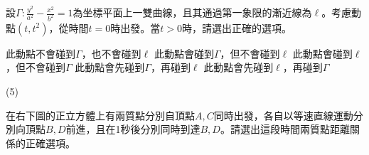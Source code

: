 \begin{QUESTIONS}
\begin{QUESTION}
\end{QUESTION}
\begin{QUESTION}
    \begin{QBODY}
        設$\Gamma :\frac{{{y}^{2}}}{{{a}^{2}}}-\frac{{{x}^{2}}}{{{b}^{2}}}=1$為坐標平面上一雙曲線，且其通過第一象限的漸近線為$\ell $。考慮動點$(t,{{t}^{2}})$，從時間$t=0$時出發。當$t>0$時，請選出正確的選項。
        \begin{QOPS}
        \QOP 此動點不會碰到$\Gamma $，也不會碰到$\ell $
        \QOP 此動點會碰到$\Gamma $，但不會碰到$\ell $
        \QOP 此動點會碰到$\ell $，但不會碰到$\Gamma $
        \QOP 此動點會先碰到$\Gamma $，再碰到$\ell $
        \QOP 此動點會先碰到$\ell $，再碰到$\Gamma $
        \end{QOPS}
    \end{QBODY}
    \begin{QFROMS}
    \end{QFROMS}
    \begin{QTAGS}
    \end{QTAGS}
    \begin{QANS}
        (5)
    \end{QANS}
    \begin{QSOL}
    \end{QSOL}
    \begin{QEMPTYSPACE}
    \end{QEMPTYSPACE}
\end{QUESTION}
\begin{QUESTION}
    \begin{QBODY}
        在右下圖的正立方體上有兩質點分別自頂點$A,C$同時出發，各自以等速直線運動分別向頂點$B,D$前進，且在1秒後分別同時到達$B,D$。請選出這段時間兩質點距離關係的正確選項。
        
\end{QBODY}
\end{QUESTION}
\end{QUESTIONS}

